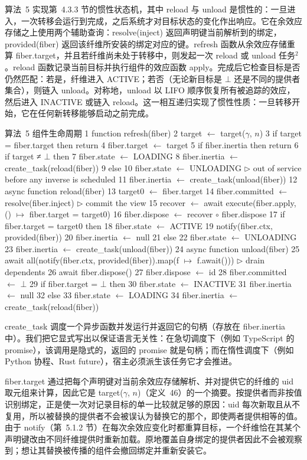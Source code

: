 \documentclass[
  10
]{article}
\begin{document}
算法~5 实现第~4.3.3 节的惯性状态机，其中 reload 与 unload 是惯性的：一旦进入，一次转移会运行到完成，之后系统才对目标状态的变化作出响应。它在余效应存储之上使用两个辅助查询：resolve(inject) 返回声明键当前解析到的绑定，provided(fiber) 返回该纤维所安装的绑定对应的键。refresh 函数从余效应存储重算 fiber.target，并且若纤维尚未处于转移中，则发起一次 reload 或 unload 任务\(^{2}\)。reload 函数记录当前目标并执行组件的效应函数 apply。完成后它检查目标是否仍然匹配：若是，纤维进入 ACTIVE；若否（无论新目标是 $\bot$ 还是不同的提供者集合），则链入 unload。对称地，unload 以 LIFO 顺序恢复所有被追踪的效应，然后进入 INACTIVE 或链入 reload。这一相互递归实现了惯性性质：一旦转移开始，它在任何新转移能够启动之前完成。

算法~5 组件生命周期
1 function refresh(fiber)
2 target $\leftarrow$ target($\gamma$, $n$)
3 if target = fiber.target then return
4 fiber.target $\leftarrow$ target
5 if fiber.inertia then return
6 if target ≠ $\bot$ then
7 fiber.state $\leftarrow$ LOADING
8 fiber.inertia $\leftarrow$ create\_task(reload(fiber))
9 else
10 fiber.state $\leftarrow$ UNLOADING $\triangleright$ out of service before any inverse is scheduled
11 fiber.inertia $\leftarrow$ create\_task(unload(fiber))
12 async function reload(fiber)
13 target0 $\leftarrow$ fiber.target
14 fiber.committed $\leftarrow$ resolve(fiber.inject) $\triangleright$ commit the view
15 recover $\leftarrow$ await execute(fiber.apply, () $\mapsto$ fiber.target = target0)
16 fiber.dispose $\leftarrow$ recover $\circ$ fiber.dispose
17 if fiber.target = target0 then
18 fiber.state $\leftarrow$ ACTIVE
19 notify(fiber.ctx, provided(fiber))
20 fiber.inertia $\leftarrow$ null
21 else
22 fiber.state $\leftarrow$ UNLOADING
23 fiber.inertia $\leftarrow$ create\_task(unload(fiber))
24 async function unload(fiber)
25 await all(notify(fiber.ctx, provided(fiber)).map(f $\mapsto$ f.await())) $\triangleright$ drain dependents
26 await fiber.dispose()
27 fiber.dispose $\leftarrow$ id
28 fiber.committed $\leftarrow$ $\bot$
29 if fiber.target = $\bot$ then
30 fiber.state $\leftarrow$ INACTIVE
31 fiber.inertia $\leftarrow$ null
32 else
33 fiber.state $\leftarrow$ LOADING
34 fiber.inertia $\leftarrow$ create\_task(reload(fiber))

create\_task 调度一个异步函数并发运行并返回它的句柄（存放在 fiber.inertia 中）。我们把它显式写出以保证语言无关性：在急切调度下（例如 TypeScript 的 promise），该调用是隐式的，返回的 promise 就是句柄；而在惰性调度下（例如 Python 协程、Rust future），宿主必须派生该任务它才会推进。

fiber.target 通过把每个声明键对当前余效应存储解析、并对提供它的纤维的 uid 取元组来计算，因此它是 target(\(\gamma\), \(n\))（定义~46）的一个摘要。按提供者而非按值识别绑定，正是使一次对记录目标的单一比较就足够的原因：uid 每次新取且从不复用，所以被替换的提供者不会被误认为替换它的那个，即使两者提供相等的值。由于 notify（第~5.1.2 节）在每次余效应变化时都重算目标，一个纤维恰在其某个声明键改由不同纤维提供时重新加载。原地覆盖自身绑定的提供者因此不会被观察到；想让其替换被传播的组件会撤回绑定并重新安装它。
\end{document}
